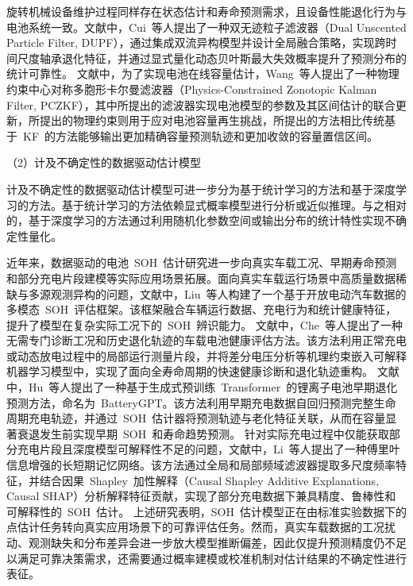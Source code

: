 旋转机械设备维护过程同样存在状态估计和寿命预测需求，且设备性能退化行为与电池系统一致。文献\cite{10385053}中，Cui~等人提出了一种双无迹粒子滤波器（Dual Unscented Particle Filter, DUPF），通过集成双流异构模型并设计全局融合策略，实现跨时间尺度轴承退化特征，并通过显式量化动态贝叶斯最大失效概率提升了预测分布的统计可靠性。
文献\cite{10672556}中，为了实现电池在线容量估计，Wang~等人提出了一种物理约束中心对称多胞形卡尔曼滤波器（Physics-Constrained Zonotopic Kalman Filter, PCZKF），其中所提出的滤波器实现电池模型的参数及其区间估计的联合更新，所提出的物理约束则用于应对电池容量再生挑战，所提出的方法相比传统基于~KF~的方法能够输出更加精确容量预测轨迹和更加收敛的容量置信区间。

（2）计及不确定性的数据驱动估计模型 %

计及不确定性的数据驱动估计模型可进一步分为基于统计学习的方法\cite{van2021bayesian, gruber2025sourcesuncertaintysupervisedmachine}和基于深度学习的方法\cite{ABDAR2021243}。基于统计学习的方法依赖显式概率模型进行分析或近似推理。与之相对的，基于深度学习的方法通过利用随机化参数空间或输出分布的统计特性实现不确定性量化。

近年来，数据驱动的电池~SOH~估计研究进一步向真实车载工况、早期寿命预测和部分充电片段建模等实际应用场景拓展。面向真实车载运行场景中高质量数据稀缺与多源观测异构的问题，文献\cite{liu2025multimodal_soh}中，Liu~等人构建了一个基于开放电动汽车数据的多模态~SOH~评估框架。该框架融合车辆运行数据、充电行为和统计健康特征，提升了模型在复杂实际工况下的~SOH~辨识能力。
文献\cite{che2025diagnostic_free}中，Che~等人提出了一种无需专门诊断工况和历史退化轨迹的车载电池健康评估方法。该方法利用正常充电或动态放电过程中的局部运行测量片段，并将差分电压分析等机理约束嵌入可解释机器学习模型中，实现了面向全寿命周期的快速健康诊断和退化轨迹重构。
文献\cite{hu2026batterygpt}中，Hu~等人提出了一种基于生成式预训练~Transformer~的锂离子电池早期退化预测方法，命名为~BatteryGPT。该方法利用早期充电数据自回归预测完整生命周期充电轨迹，并通过~SOH~估计器将预测轨迹与老化特征关联，从而在容量显著衰退发生前实现早期~SOH~和寿命趋势预测。
针对实际充电过程中仅能获取部分充电片段且深度模型可解释性不足的问题，文献\cite{li2026fourier_lstm}中，Li~等人提出了一种傅里叶信息增强的长短期记忆网络。该方法通过全局和局部频域滤波器提取多尺度频率特征，并结合因果~Shapley~加性解释（Causal Shapley Additive Explanations, Causal SHAP）分析解释特征贡献，实现了部分充电数据下兼具精度、鲁棒性和可解释性的~SOH~估计。
上述研究表明，SOH~估计模型正在由标准实验数据下的点估计任务转向真实应用场景下的可靠评估任务。然而，真实车载数据的工况扰动、观测缺失和分布差异会进一步放大模型推断偏差，因此仅提升预测精度仍不足以满足可靠决策需求，还需要通过概率建模或校准机制对估计结果的不确定性进行表征。

